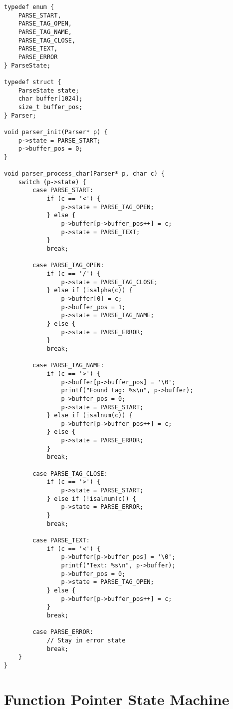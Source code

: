 \begin{lstlisting}
typedef enum {
    PARSE_START,
    PARSE_TAG_OPEN,
    PARSE_TAG_NAME,
    PARSE_TAG_CLOSE,
    PARSE_TEXT,
    PARSE_ERROR
} ParseState;

typedef struct {
    ParseState state;
    char buffer[1024];
    size_t buffer_pos;
} Parser;

void parser_init(Parser* p) {
    p->state = PARSE_START;
    p->buffer_pos = 0;
}

void parser_process_char(Parser* p, char c) {
    switch (p->state) {
        case PARSE_START:
            if (c == '<') {
                p->state = PARSE_TAG_OPEN;
            } else {
                p->buffer[p->buffer_pos++] = c;
                p->state = PARSE_TEXT;
            }
            break;

        case PARSE_TAG_OPEN:
            if (c == '/') {
                p->state = PARSE_TAG_CLOSE;
            } else if (isalpha(c)) {
                p->buffer[0] = c;
                p->buffer_pos = 1;
                p->state = PARSE_TAG_NAME;
            } else {
                p->state = PARSE_ERROR;
            }
            break;

        case PARSE_TAG_NAME:
            if (c == '>') {
                p->buffer[p->buffer_pos] = '\0';
                printf("Found tag: %s\n", p->buffer);
                p->buffer_pos = 0;
                p->state = PARSE_START;
            } else if (isalnum(c)) {
                p->buffer[p->buffer_pos++] = c;
            } else {
                p->state = PARSE_ERROR;
            }
            break;

        case PARSE_TAG_CLOSE:
            if (c == '>') {
                p->state = PARSE_START;
            } else if (!isalnum(c)) {
                p->state = PARSE_ERROR;
            }
            break;

        case PARSE_TEXT:
            if (c == '<') {
                p->buffer[p->buffer_pos] = '\0';
                printf("Text: %s\n", p->buffer);
                p->buffer_pos = 0;
                p->state = PARSE_TAG_OPEN;
            } else {
                p->buffer[p->buffer_pos++] = c;
            }
            break;

        case PARSE_ERROR:
            // Stay in error state
            break;
    }
}
\end{lstlisting}

\section{Function Pointer State Machine}

